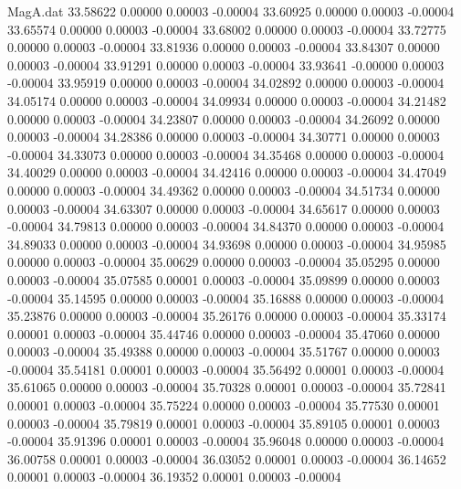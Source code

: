\begin{filecontents}{MagA.dat}
  33.58622    0.00000    0.00003   -0.00004
  33.60925    0.00000    0.00003   -0.00004
  33.65574    0.00000    0.00003   -0.00004
  33.68002    0.00000    0.00003   -0.00004
  33.72775    0.00000    0.00003   -0.00004
  33.81936    0.00000    0.00003   -0.00004
  33.84307    0.00000    0.00003   -0.00004
  33.91291    0.00000    0.00003   -0.00004
  33.93641   -0.00000    0.00003   -0.00004
  33.95919    0.00000    0.00003   -0.00004
  34.02892    0.00000    0.00003   -0.00004
  34.05174    0.00000    0.00003   -0.00004
  34.09934    0.00000    0.00003   -0.00004
  34.21482    0.00000    0.00003   -0.00004
  34.23807    0.00000    0.00003   -0.00004
  34.26092    0.00000    0.00003   -0.00004
  34.28386    0.00000    0.00003   -0.00004
  34.30771    0.00000    0.00003   -0.00004
  34.33073    0.00000    0.00003   -0.00004
  34.35468    0.00000    0.00003   -0.00004
  34.40029    0.00000    0.00003   -0.00004
  34.42416    0.00000    0.00003   -0.00004
  34.47049    0.00000    0.00003   -0.00004
  34.49362    0.00000    0.00003   -0.00004
  34.51734    0.00000    0.00003   -0.00004
  34.63307    0.00000    0.00003   -0.00004
  34.65617    0.00000    0.00003   -0.00004
  34.79813    0.00000    0.00003   -0.00004
  34.84370    0.00000    0.00003   -0.00004
  34.89033    0.00000    0.00003   -0.00004
  34.93698    0.00000    0.00003   -0.00004
  34.95985    0.00000    0.00003   -0.00004
  35.00629    0.00000    0.00003   -0.00004
  35.05295    0.00000    0.00003   -0.00004
  35.07585    0.00001    0.00003   -0.00004
  35.09899    0.00000    0.00003   -0.00004
  35.14595    0.00000    0.00003   -0.00004
  35.16888    0.00000    0.00003   -0.00004
  35.23876    0.00000    0.00003   -0.00004
  35.26176    0.00000    0.00003   -0.00004
  35.33174    0.00001    0.00003   -0.00004
  35.44746    0.00000    0.00003   -0.00004
  35.47060    0.00000    0.00003   -0.00004
  35.49388    0.00000    0.00003   -0.00004
  35.51767    0.00000    0.00003   -0.00004
  35.54181    0.00001    0.00003   -0.00004
  35.56492    0.00001    0.00003   -0.00004
  35.61065    0.00000    0.00003   -0.00004
  35.70328    0.00001    0.00003   -0.00004
  35.72841    0.00001    0.00003   -0.00004
  35.75224    0.00000    0.00003   -0.00004
  35.77530    0.00001    0.00003   -0.00004
  35.79819    0.00001    0.00003   -0.00004
  35.89105    0.00001    0.00003   -0.00004
  35.91396    0.00001    0.00003   -0.00004
  35.96048    0.00000    0.00003   -0.00004
  36.00758    0.00001    0.00003   -0.00004
  36.03052    0.00001    0.00003   -0.00004
  36.14652    0.00001    0.00003   -0.00004
  36.19352    0.00001    0.00003   -0.00004

\end{filecontents}

